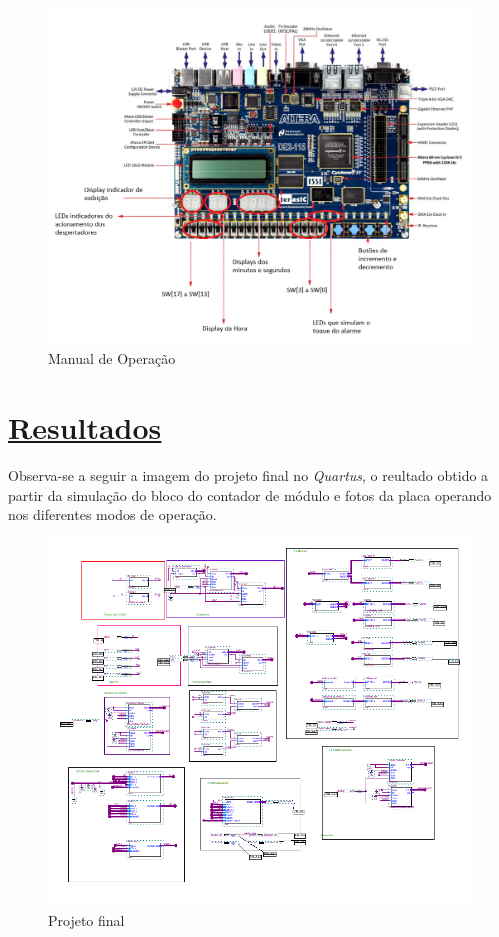 \documentclass[14pt, oneside]{book}
\newcommand\tab[1][1cm]{\hspace*{#1}}
\theoremstyle{definition}
\begin{document}
                \begin{figure}[H]
                    \centering                    \includegraphics[width=\columnwidth]{manual_placa.png}
                    \caption{Manual de Operação}
                    \label{manual}
                \end{figure}
                
         
         \chapter[Resultados]{\hyperlink{toc}{Resultados}}
            
            \tab Observa-se a seguir a imagem do projeto final no \textit{Quartus}, o reultado obtido a partir da simulação do bloco do contador de módulo e fotos da placa operando nos diferentes modos de operação.
                
                \begin{figure}[H]
                    \centering
                    \includegraphics[width=\columnwidth]{projeto_final.PNG}
                    \caption{Projeto final}
                    \label{projeto final}
                \end{figure}
            
\end{document}
